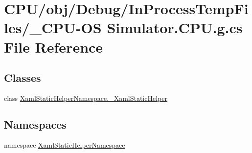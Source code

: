 \hypertarget{___c_p_u-_o_s_01_simulator_8_c_p_u_8g_8cs}{}\section{C\+P\+U/obj/\+Debug/\+In\+Process\+Temp\+Files/\+\_\+\+C\+P\+U-\/\+O\+S Simulator.\+C\+P\+U.\+g.\+cs File Reference}
\label{___c_p_u-_o_s_01_simulator_8_c_p_u_8g_8cs}
\subsection*{Classes}
\begin{DoxyCompactItemize}
\item 
class \hyperlink{class_xaml_static_helper_namespace_1_1___xaml_static_helper}{Xaml\+Static\+Helper\+Namespace.\+\_\+\+Xaml\+Static\+Helper}
\end{DoxyCompactItemize}
\subsection*{Namespaces}
\begin{DoxyCompactItemize}
\item 
namespace \hyperlink{namespace_xaml_static_helper_namespace}{Xaml\+Static\+Helper\+Namespace}
\end{DoxyCompactItemize}
